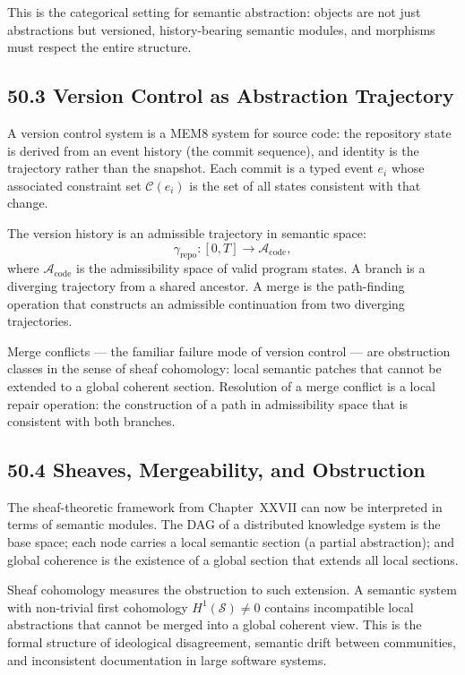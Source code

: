 \documentclass[12pt,letterpaper]{article}
\theoremstyle{remark}
\begin{document}
This is the categorical setting for semantic abstraction: objects
are not just abstractions but versioned, history-bearing semantic
modules, and morphisms must respect the entire structure.

\subsection{50.3 Version Control as Abstraction Trajectory}

A version control system is a MEM\textbar{}8 system for source
code: the repository state is derived from an event history (the
commit sequence), and identity is the trajectory rather than the
snapshot. Each commit is a typed event $e_i$ whose associated
constraint set $\mathcal{C}(e_i)$ is the set of all states
consistent with that change.

The version history is an admissible trajectory in semantic space:
\[
\gamma_{\mathrm{repo}}: [0, T] \to \mathcal{A}_{\mathrm{code}},
\]
where $\mathcal{A}_{\mathrm{code}}$ is the admissibility space of
valid program states. A branch is a diverging trajectory from a
shared ancestor. A merge is the path-finding operation that
constructs an admissible continuation from two diverging
trajectories.

Merge conflicts — the familiar failure mode of version control —
are obstruction classes in the sense of sheaf cohomology: local
semantic patches that cannot be extended to a global coherent
section. Resolution of a merge conflict is a local repair
operation: the construction of a path in admissibility space that
is consistent with both branches.

\subsection{50.4 Sheaves, Mergeability, and Obstruction}

The sheaf-theoretic framework from Chapter~XXVII can now be
interpreted in terms of semantic modules. The DAG of a distributed
knowledge system is the base space; each node carries a local
semantic section (a partial abstraction); and global coherence is
the existence of a global section that extends all local sections.

Sheaf cohomology measures the obstruction to such extension. A
semantic system with non-trivial first cohomology $H^1(\mathcal{S}) \neq 0$ contains incompatible local abstractions that cannot be
merged into a global coherent view. This is the formal structure of
ideological disagreement, semantic drift between communities, and
inconsistent documentation in large software systems.
\end{document}
